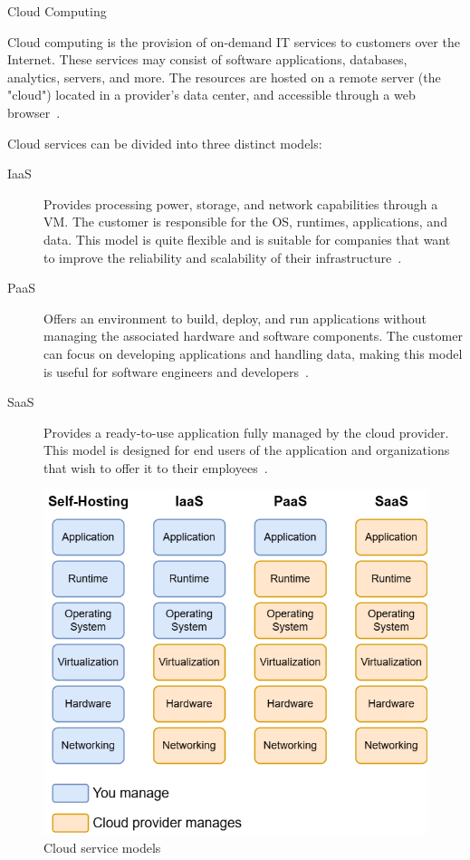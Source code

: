 \documentclass[12pt, reqno, oneside]{amsbook}
\makeatletter
\def\section{\@startsection{section}{1}%
      \z@{.5\linespacing\@plus.7\linespacing}{.25\linespacing}%
      {\normalfont\bfseries\flushleft}}
\theoremstyle{definition}
\theoremstyle{definition}
\numberwithin{section}{chapter}
\numberwithin{table}{chapter}
\numberwithin{figure}{chapter}
\makeatother
\begin{document}
\section{Cloud Computing}
\label{Section:Cloud_Computing}

Cloud computing is the provision of on-demand \ac{IT} services to customers over the Internet. These services may consist of software applications, databases, analytics, servers, and more. The resources are hosted on a remote server (the "cloud") located in a provider's data center, and accessible through a web browser~\cite{Figueira2024,  Nordic2012, Nadeem2024, Villamizar2016}.

Cloud services can be divided into three distinct models:
\begin{description}
  \item [\ac{IaaS}] Provides processing power, storage, and network capabilities through a \ac{VM}. The customer is responsible for the \ac{OS}, runtimes, applications, and data. This model is quite flexible and is suitable for companies that want to improve the reliability and scalability of their infrastructure~\cite{Figueira2024, Nordic2012, Google, Berry2021}.
  \item [\ac{PaaS}] Offers an environment to build, deploy, and run applications without managing the associated hardware and software components. The customer can focus on developing applications and handling data, making this model is useful for software engineers and developers~\cite{Figueira2024, Nordic2012, Google, Berry2021}.
  \item [\ac{SaaS}] Provides a ready-to-use application fully managed by the cloud provider. This model is designed for end users of the application and organizations that wish to offer it to their employees~\cite{Figueira2024, Nordic2012, Google, Berry2021}.
\end{description}

\FloatBarrier
\begin{figure}[H]
  \includegraphics[width=0.7\linewidth]{images/Cloud_service_models.png}
  \caption{\label{Figure:Cloud_service_models}Cloud service models}
\end{figure}
\FloatBarrier
\end{document}
